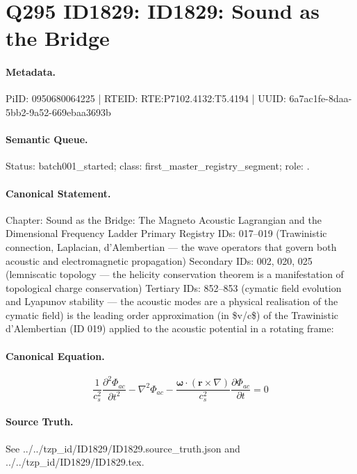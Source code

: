 \section*{Q295 ID1829: ID1829: Sound as the Bridge}
\paragraph{Metadata.}
PiID: 0950680064225 | RTEID: RTE:P7102.4132:T5.4194 | UUID: 6a7ac1fe-8daa-5bb2-9a52-669ebaa3693b

\paragraph{Semantic Queue.}
Status: batch001\_started; class: first\_master\_registry\_segment; role: .

\paragraph{Canonical Statement.}
Chapter: Sound as the Bridge: The Magneto Acoustic Lagrangian and the Dimensional Frequency Ladder Primary Registry IDs: 017–019 (Trawinistic connection, Laplacian, d'Alembertian — the wave operators that govern both acoustic and electromagnetic propagation) Secondary IDs: 002, 020, 025 (lemniscatic topology — the helicity conservation theorem is a manifestation of topological charge conservation) Tertiary IDs: 852–853 (cymatic field evolution and Lyapunov stability — the acoustic modes are a physical realisation of the cymatic field) is the leading order approximation (in \$v/c\$) of the Trawinistic d'Alembertian (ID 019) applied to the acoustic potential in a rotating frame:

\paragraph{Canonical Equation.}
\[
\frac{1}{c_s^2}\frac{\partial^2\Phi_{ac}}{\partial t^2} - \nabla^2\Phi_{ac} - \frac{\boldsymbol{\omega}\cdot(\mathbf{r}\times\nabla)}{c_s^2}\frac{\partial\Phi_{ac}}{\partial t} = 0
\]

\paragraph{Source Truth.}
See ../../tzp\_id/ID1829/ID1829.source\_truth.json and ../../tzp\_id/ID1829/ID1829.tex.

